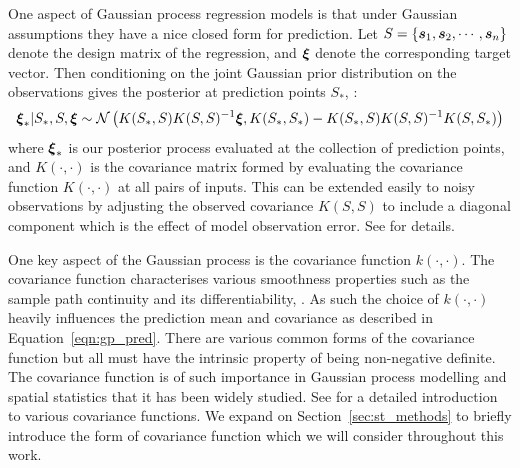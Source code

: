 One aspect of Gaussian process regression models is that under Gaussian assumptions they have a nice closed form for prediction. Let $S = \{ \bm{{s}}_{1}, \bm{{s}}_{2}, \cdots, \bm{{s}}_{n}\}$ denote the design matrix of the regression, and $\bm{{\xi}}$ denote the corresponding target vector.
Then conditioning on the joint Gaussian prior distribution on the observations gives the posterior at prediction points $S_*$, \citep{williams_gaussian_2006}:
\begin{equation}\label{eqn:gp_pred}
	\bm{{\xi}}_{*} | S_{*}, S, \bm{{\xi}} \sim \mathcal{N}\left(K(S_*, S)K(S, S)^{-1} \bm{{\xi}}, K(S_*, S_*) - K(S_*, S)K(S, S)^{-1}K(S, S_*)\right)
\end{equation}
where $\bm{{\xi}}_{*}$ is our posterior process evaluated at the collection of prediction points, and $K(\cdot, \cdot)$ is the covariance matrix formed by evaluating the covariance function $K(\cdot, \cdot)$ at all pairs of inputs. This can be extended easily to noisy observations by adjusting the observed covariance $K(S, S)$ to include a diagonal component which is the effect of model observation error. See \citep{williams_gaussian_2006} for details.

One key aspect of the Gaussian process is the covariance function $k(\cdot, \cdot)$.
The covariance function characterises various smoothness properties such as the sample path continuity and its differentiability, \citep{williams_gaussian_2006}.
As such the choice of $k(\cdot, \cdot)$ heavily influences the prediction mean and covariance as described in Equation~\eqref{eqn:gp_pred}.
There are various common forms of the covariance function but all must have the intrinsic property of being non-negative definite.
The covariance function is of such importance in Gaussian process modelling and spatial statistics that it has been widely studied.
See \citep[Chapter~4]{williams_gaussian_2006} for a detailed introduction to various covariance functions. We expand on Section~\ref{sec:st_methods} to briefly introduce the form of covariance function which we will consider throughout this work. 

